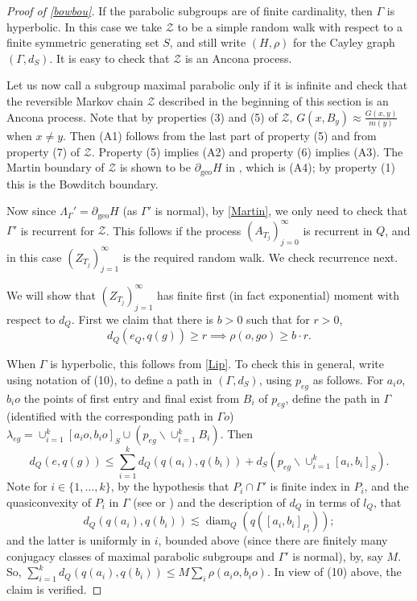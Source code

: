 \documentclass[12pt,a4paper]{amsart}
\numberwithin{equation}{section}
\theoremstyle{definition}
\DeclareMathOperator{\diam}{diam}
\DeclareMathOperator{\geo}{geo}
\begin{document}
\begin{proof}[Proof of \cref{bowbou}]
If the parabolic subgroups are of finite cardinality, then $\Gamma$ is hyperbolic. In this case we take $\mathcal Z$ to be a simple random walk with respect to a finite symmetric generating set $S$, and still write $(H,\rho)$ for the Cayley graph $(\Gamma,d_S)$. It is easy to check that $\mathcal Z$ is an Ancona process.

Let us now call a subgroup maximal parabolic only if it is infinite and check that the reversible Markov chain $\mathcal Z$ described in the beginning of this section is an Ancona process. Note that by properties (3) and (5) of $\mathcal Z$, $G(x,B_y)\approx \frac{G(x,y)}{m(y)}$ when $x\neq y$.  Then (A1) follows from the last part of property (5) and from property (7) of $\mathcal Z$. Property (5) implies (A2) and property (6) implies (A3). The Martin boundary of $\mathcal Z$ is shown to be $\partial_{\geo}H$ in \cite[Section 3]{Nan}, which is (A4); by property (1) this is the Bowditch boundary.  

Now since $\Lambda_\Gamma'=\partial_{\geo}H$ (as $\Gamma'$ is normal), by \cref{Martin}, we only need to check that $\Gamma'$ is recurrent for $\mathcal{Z}$. This follows if the process $(A_{T_j})_{j=0}^\infty$ is recurrent in $Q$, and in this case $(Z_{T_j})_{j=1}^\infty$ is the required random walk. We check recurrence next.


We will show that $(Z_{T_j})_{j=1}^\infty$ has finite first (in fact exponential) moment with respect to $d_Q$.
First we claim that there is $b>0$ such that for $r>0$, \[d_Q(e_Q,q(g))\geq r\implies \rho(o,go)\geq b\cdot r.\]

When $\Gamma$ is hyperbolic, this follows from \cref{Lip}. To check this in general, write using notation of (10), to define a path in $(\Gamma,d_S)$, using $p_{eg}$ as follows. For $a_io$, $b_io$ the points of first entry and final exist from $B_i$ of $p_{eg}$, define the path in $\Gamma$ (identified with the corresponding path in $\Gamma o$) $\lambda_{eg}=\cup_{i=1}^k [a_io,b_io]_S\cup (p_{eg}\backslash \cup_{i=1}^k B_i)$. Then
\[d_Q(e,q(g))\leq \sum_{i=1}^k d_Q(q(a_i),q(b_i))+d_S(p_{eg}\backslash \cup_{i=1}^k [a_i,b_i]_S).\]
Note for $i\in\{1,\ldots,k\}$,
by the hypothesis that $P_i\cap \Gamma'$ is finite index in $P_i$, and the quasiconvexity of $P_i$ in $\Gamma$ (see \cite{DS} or \cite{GP}) and the description of $d_Q$ in terms of $l_Q$, that \[d_Q(q(a_i),q(b_i))\lesssim \diam_Q(q([a_i,b_i]_{P_i}));\]
and the latter is uniformly in $i$, bounded above (since there are finitely many conjugacy classes of maximal parabolic subgroups and $\Gamma'$ is normal), by, say $M$. So, $\sum_{i=1}^kd_Q(q(a_i),q(b_i))\leq M\sum_i\rho(a_io,b_io)$. In view of (10) above, the claim is verified.


\end{proof}
\end{document}
